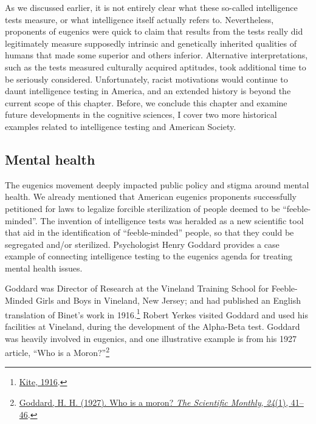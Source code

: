 \documentclass[
  oneside,
  12pt]{crumpbook}
\begin{document}
As we discussed earlier, it is not entirely clear what these so-called intelligence tests measure, or what intelligence itself actually refers to. Nevertheless, proponents of eugenics were quick to claim that results from the tests really did legitimately measure supposedly intrinsic and genetically inherited qualities of humans that made some superior and others inferior. Alternative interpretations, such as the tests measured culturally acquired aptitudes, took additional time to be seriously considered. Unfortunately, racist motivations would continue to daunt intelligence testing in America, and an extended history is beyond the current scope of this chapter. Before, we conclude this chapter and examine future developments in the cognitive sciences, I cover two more historical examples related to intelligence testing and American Society.

\hypertarget{mental-health}{%
\subsection{Mental health}\label{mental-health}}

The eugenics movement deeply impacted public policy and stigma around mental health. We already mentioned that American eugenics proponents successfully petitioned for laws to legalize forcible sterilization of people deemed to be ``feeble-minded''. The invention of intelligence tests was heralded as a new scientific tool that aid in the identification of ``feeble-minded'' people, so that they could be segregated and/or sterilized. Psychologist Henry Goddard provides a case example of connecting intelligence testing to the eugenics agenda for treating mental health issues.

Goddard was Director of Research at the Vineland Training School for Feeble-Minded Girls and Boys in Vineland, New Jersey; and had published an English translation of Binet's work in 1916.\footnote{\protect\hyperlink{ref-kiteDevelopmentIntelligenceChildren1916}{Kite, 1916}.} Robert Yerkes visited Goddard and used his facilities at Vineland, during the development of the Alpha-Beta test. Goddard was heavily involved in eugenics, and one illustrative example is from his 1927 article, ``Who is a Moron?''\footnote{\protect\hyperlink{ref-goddardWhoMoron1927}{Goddard, H. H. (1927). Who is a moron? \emph{The Scientific Monthly}, \emph{24}(1), 41--46}.}
\end{document}
